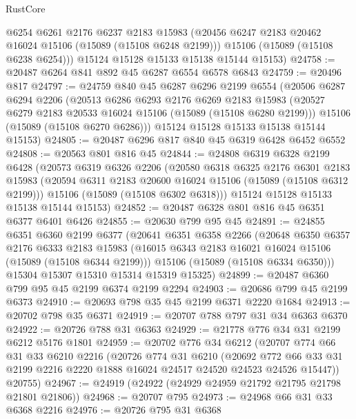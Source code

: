 \begin{lexlean}{RustCore}
\begin{coremodule}
        @6254
        @6261
        @2176
        @6237
        @2183
        @15983
        (@20456 @6247 @2183 @20462 @16024 @15106 (@15089 (@15108 @6248 @2199)))
        @15106
        (@15089 (@15108 @6238 @6254)))
      @15124
      @15128
      @15133
      @15138
      @15144
      @15153)
@24758 := @20487 @6264 @841 @892 @45 @6287 @6554 @6578 @6843
@24759 := @20496 @817
@24797 := @24759
    @840
    @45
    @6287
    @6296
    @2199
    @6554
    (@20506
      @6287
      @6294
      @2206
      (@20513
        @6286
        @6293
        @2176
        @6269
        @2183
        @15983
        (@20527 @6279 @2183 @20533 @16024 @15106 (@15089 (@15108 @6280 @2199)))
        @15106
        (@15089 (@15108 @6270 @6286)))
      @15124
      @15128
      @15133
      @15138
      @15144
      @15153)
@24805 := @20487 @6296 @817 @840 @45 @6319 @6428 @6452 @6552
@24808 := @20563 @801 @816 @45
@24844 := @24808
    @6319
    @6328
    @2199
    @6428
    (@20573
      @6319
      @6326
      @2206
      (@20580
        @6318
        @6325
        @2176
        @6301
        @2183
        @15983
        (@20594 @6311 @2183 @20600 @16024 @15106 (@15089 (@15108 @6312 @2199)))
        @15106
        (@15089 (@15108 @6302 @6318)))
      @15124
      @15128
      @15133
      @15138
      @15144
      @15153)
@24852 := @20487 @6328 @801 @816 @45 @6351 @6377 @6401 @6426
@24855 := @20630 @799 @95 @45
@24891 := @24855
    @6351
    @6360
    @2199
    @6377
    (@20641
      @6351
      @6358
      @2266
      (@20648
        @6350
        @6357
        @2176
        @6333
        @2183
        @15983
        (@16015 @6343 @2183 @16021 @16024 @15106 (@15089 (@15108 @6344 @2199)))
        @15106
        (@15089 (@15108 @6334 @6350)))
      @15304
      @15307
      @15310
      @15314
      @15319
      @15325)
@24899 := @20487 @6360 @799 @95 @45 @2199 @6374 @2199 @2294
@24903 := @20686 @799 @45 @2199 @6373
@24910 := @20693 @798 @35 @45 @2199 @6371 @2220 @1684
@24913 := @20702 @798 @35 @6371
@24919 := @20707 @788 @797 @31 @34 @6363 @6370
@24922 := @20726 @788 @31 @6363
@24929 := @21778 @776 @34 @31 @2199 @6212 @5176 @1801
@24959 := @20702
    @776
    @34
    @6212
    (@20707
      @774
      @66
      @31
      @33
      @6210
      @2216
      (@20726
        @774
        @31
        @6210
        (@20692 @772 @66 @33 @31 @2199 @2216 @2220 @1888 @16024 @24517 @24520 @24523 @24526 @15447))
      @20755)
@24967 := @24919 (@24922 (@24929 @24959 @21792 @21795 @21798 @21801 @21806))
@24968 := @20707 @795
@24973 := @24968 @66 @31 @33 @6368 @2216
@24976 := @20726 @795 @31 @6368

\end{coremodule}
\end{lexlean}

